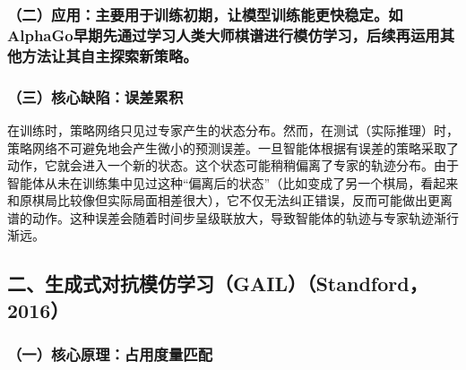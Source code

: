 \hypertarget{ux4e8cux5e94ux7528ux4e3bux8981ux7528ux4e8eux8badux7ec3ux521dux671fux8ba9ux6a21ux578bux8badux7ec3ux80fdux66f4ux5febux7a33ux5b9aux5982alphagoux65e9ux671fux5148ux901aux8fc7ux5b66ux4e60ux4ebaux7c7bux5927ux5e08ux68cbux8c31ux8fdbux884cux6a21ux4effux5b66ux4e60ux540eux7eedux518dux8fd0ux7528ux5176ux4ed6ux65b9ux6cd5ux8ba9ux5176ux81eaux4e3bux63a2ux7d22ux65b0ux7b56ux7565}{%
\subsubsection{（二）应用：主要用于训练初期，让模型训练能更快稳定。如AlphaGo早期先通过学习人类大师棋谱进行模仿学习，后续再运用其他方法让其自主探索新策略。}\label{ux4e8cux5e94ux7528ux4e3bux8981ux7528ux4e8eux8badux7ec3ux521dux671fux8ba9ux6a21ux578bux8badux7ec3ux80fdux66f4ux5febux7a33ux5b9aux5982alphagoux65e9ux671fux5148ux901aux8fc7ux5b66ux4e60ux4ebaux7c7bux5927ux5e08ux68cbux8c31ux8fdbux884cux6a21ux4effux5b66ux4e60ux540eux7eedux518dux8fd0ux7528ux5176ux4ed6ux65b9ux6cd5ux8ba9ux5176ux81eaux4e3bux63a2ux7d22ux65b0ux7b56ux7565}}

\hypertarget{ux4e09ux6838ux5fc3ux7f3aux9677ux8befux5deeux7d2fux79ef}{%
\subsubsection{（三）核心缺陷：误差累积}\label{ux4e09ux6838ux5fc3ux7f3aux9677ux8befux5deeux7d2fux79ef}}

在训练时，策略网络只见过专家产生的状态分布。然而，在测试（实际推理）时，策略网络不可避免地会产生微小的预测误差。一旦智能体根据有误差的策略采取了动作，它就会进入一个新的状态。这个状态可能稍稍偏离了专家的轨迹分布。由于智能体从未在训练集中见过这种``偏离后的状态''（比如变成了另一个棋局，看起来和原棋局比较像但实际局面相差很大），它不仅无法纠正错误，反而可能做出更离谱的动作。这种误差会随着时间步呈级联放大，导致智能体的轨迹与专家轨迹渐行渐远。

\hypertarget{ux4e8cux751fux6210ux5f0fux5bf9ux6297ux6a21ux4effux5b66ux4e60gailstandford2016}{%
\subsection{二、生成式对抗模仿学习（GAIL）（Standford，2016）}\label{ux4e8cux751fux6210ux5f0fux5bf9ux6297ux6a21ux4effux5b66ux4e60gailstandford2016}}

\hypertarget{ux4e00ux6838ux5fc3ux539fux7406ux5360ux7528ux5ea6ux91cfux5339ux914d}{%
\subsubsection{（一）核心原理：占用度量匹配}\label{ux4e00ux6838ux5fc3ux539fux7406ux5360ux7528ux5ea6ux91cfux5339ux914d}}


